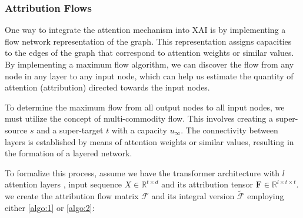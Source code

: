 \documentclass{article} %
\theoremstyle{bfnote}
\begin{document}
%
%
%


\subsubsection{Attribution Flows}
One way to integrate the attention mechanism into XAI is by implementing a flow network representation of the graph. This representation assigns capacities to the edges of the graph that correspond to attention weights or similar values. By implementing a maximum flow algorithm, we can discover the flow from any node in any layer to any input node, which can help us estimate the quantity of attention (attribution) directed towards the input nodes.

To determine the maximum flow from all output nodes to all input nodes, we must utilize the concept of multi-commodity flow. This involves creating a super-source $s$ and a super-target $t$ with a capacity $u_{\infty}$. The connectivity between layers is established by means of attention weights or similar values, resulting in the formation of a layered network.

To formalize this process, assume we have the transformer architecture with $l$ attention layers , input sequence $X\in \mathbb{R}^{t \times d}$ and its attribution tensor $\bm{F} \in \mathbb{R}^{l \times t \times t}$. we create the attribution flow matrix $\mathcal{F}$ and its integral version $\widetilde{\mathcal{F}}$ employing either \cref{algo:1} or \cref{algo:2}:
\end{document}
